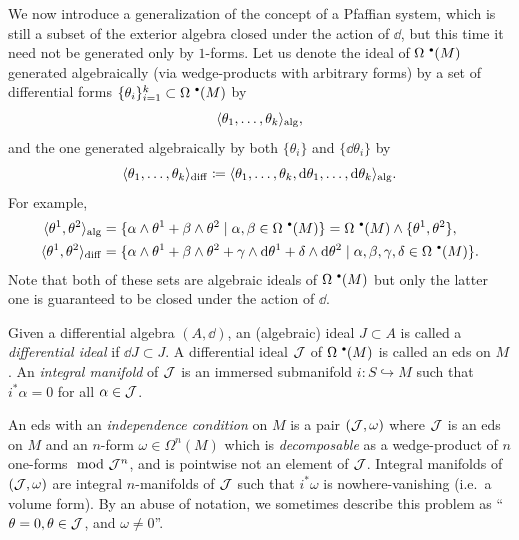 We now introduce a generalization of the concept of a Pfaffian system, which is still a subset of the exterior algebra closed under the action of $\dd$, but this time it need not be generated only by $1$-forms. Let us denote the ideal of $\Omega^{\smbullet}(M)$ generated algebraically (via wedge-products with arbitrary forms) by a set of differential forms $\{\theta_i\}_{i=1}^k\subset \Omega^{\smbullet }(M)$ by 
\[\langle\theta_1,\ldots,\theta_k\rangle_{\mathrm{alg}},\]
and the one generated algebraically by both $\{\theta_i\}$ and $\{\dd\theta_i\}$ by 
\[\langle\theta_1,\ldots,\theta_k\rangle_{\mathrm{diff}}\coloneqq \langle\theta_1,\ldots,\theta_k,{\mathrm{d}}\theta_1,\ldots,{\mathrm{d}}\theta_k\rangle_{\mathrm{alg}}.\]
For example, 
\begin{align}
    \<\theta^1,\theta^2\>_{\mathrm{alg}}&=\{\alpha\wedge\theta^1+\beta\wedge\theta^2\mid \alpha,\beta\in\Omega^{\smbullet }(M)\}=\Omega^{\smbullet}(M)\wedge\{\theta^1,\theta^2\},\\
    \<\theta^1,\theta^2\>_{\mathrm{diff}}&=\{\alpha\wedge\theta^1+\beta\wedge\theta^2+\gamma\wedge\dd\theta^1+\delta\wedge\dd\theta^2\mid \alpha,\beta,\gamma,\delta\in\Omega^{\smbullet }(M)\}.
\end{align}
Note that both of these sets are algebraic ideals of $\Omega^{\smbullet }(M)$ but only the latter one is guaranteed to be closed under the action of $\dd$.

\begin{defn}
    Given a differential algebra $(A,\dd)$, an (algebraic) ideal $J\subset A$ is called a \emph{differential ideal} if $\dd J\subset J$.
    A differential ideal $\mathcal{J}$ of $\Omega^{\smbullet }(M)$ is called an \gls{eds} on $M$. An \emph{integral manifold} of $\mathcal{J}$ is an immersed submanifold $i:S\hookrightarrow M$ such that $i^\ast\alpha=0$ for all $\alpha\in \mathcal{J}$. 

    An \gls{eds} with an \emph{independence condition} on $M$ is a pair $(\mathcal{J},\omega)$ where $\mathcal{J}$ is an \gls{eds} on $M$ and an $n$-form $\omega\in\Omega^n (M)$ which is \emph{decomposable} as a wedge-product of $n$ one-forms $\ \mathrm{mod}\  \mathcal{J}^n$, and is pointwise not an element of $\mathcal{J}$. Integral manifolds of $(\mathcal{J},\omega)$ are integral $n$-manifolds of $\mathcal{J}$ such that $i^\ast \omega$ is nowhere-vanishing (i.e.\ a volume form). By an abuse of notation, we sometimes describe this problem as ``$\theta=0,\theta\in \mathcal{J}$, and $\omega\neq 0$''.
\end{defn}

